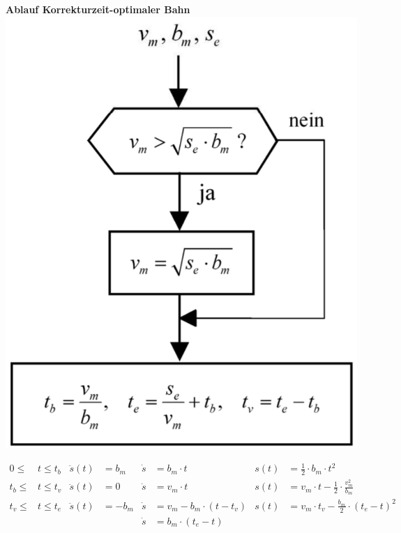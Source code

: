 \begin{minipage}{0.35\linewidth}
    \textbf{Ablauf Korrektur\newline zeit-optimaler Bahn}\newline
    \includegraphics[width=\linewidth]{./bilder/RampenVorgehn}
\end{minipage}
    \begin{align*}
0 \le   &t \le t_b   &  \ddot{s}(t) &= b_m        & \dot{s}&=b_m \cdot t               &  s(t)&=\frac{1}{2}\cdot b_m \cdot t^2\\ 
t_b \le &t \le t_v   &  \ddot{s}(t) &= 0          &  \dot{s}&=v_m \cdot t              &  s(t)&=v_m \cdot t - \frac{1}{2}\cdot \frac{v_m^2}{b_m}\\
t_v \le &t \le t_e   &  \ddot{s}(t) &= -b_m       &  \dot{s}&=v_m -b_m \cdot (t-t_v)   &  s(t)&=v_m \cdot t_v - \frac{b_m}{2}\cdot(t_e - t)^2\\       
&            &              &             &  \dot{s}&=b_m \cdot (t_e-t)                &      &
\end{align*}
